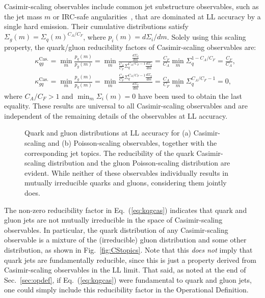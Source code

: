 \documentclass[letterpaper,11pt]{article}
\DeclareRobustCommand{\Sec}[1]{Sec.~\ref{#1}}
\DeclareRobustCommand{\Fig}[1]{Fig.~\ref{#1}}
\DeclareRobustCommand{\Eq}[1]{Eq.~(\ref{#1})}
\begin{document}
Casimir-scaling observables include common jet substructure observables, such as the jet mass $m$ or IRC-safe angularities~\cite{Berger:2003iw,Almeida:2008yp,Ellis:2010rwa,Larkoski:2014uqa,Larkoski:2014pca}, that are dominated at LL accuracy by a single hard emission.
%
Their cumulative distributions satisfy $\Sigma_g (m)= \Sigma_q(m)^{C_A/C_F}$, where $p_i(m) = d\Sigma_i/dm$.
%
Solely using this scaling property, the quark/gluon reducibility factors of Casimir-scaling observables are:
\begin{align}\label{eq:kqgcas}
&\kappa_{qg}^\text{Cas.} = \min_m\frac{p_q(m)}{p_g(m)} = \min_m\frac{\frac{d\Sigma_q}{dm}}{\frac{C_A}{C_F} \Sigma_q^{C_A/C_F - 1}\frac{d\Sigma_q}{dm}}  = \frac{C_F}{C_A} \min_m\Sigma_q^{1-C_A/C_F} = \frac{C_F}{C_A}, \\
&\kappa_{gq}^\text{Cas.} = \min_m\frac{p_g(m)}{p_q(m)} = \min_m\frac{\frac{C_A}{C_F} \Sigma_q^{C_A/C_F - 1}\frac{d\Sigma_q}{dm}}{\frac{d\Sigma_q}{dm}}  = \frac{C_A}{C_F} \min_m\Sigma_q^{C_A/C_F-1} = 0, \label{eq:kgqcas}
\end{align}
where $C_A/C_F > 1$ and $\min_m\Sigma_i(m)=0$ have been used to obtain the last equality.
%
These results are universal to all Casimir-scaling observables and are independent of the remaining details of the observables at LL accuracy.

\begin{figure}[t]
\centering
{}
\caption{
%
Quark and gluon distributions at LL accuracy for (a) Casimir-scaling and (b) Poisson-scaling observables, together with the corresponding jet topics.
%
The reducibility of the quark Casimir-scaling distribution and the gluon Poisson-scaling distribution are evident.
%
While neither of these observables individually results in mutually irreducible quarks and gluons, considering them jointly does.
}
\label{fig:LLtopics}
\end{figure}


The non-zero reducibility factor in \Eq{eq:kqgcas} indicates that quark and gluon jets are not mutually irreducible in the space of Casimir-scaling observables.
%
In particular, the quark distribution of any Casimir-scaling observable is a mixture of the (irreducible) gluon distribution and some other distribution, as shown in \Fig{fig:CStopics}.
%
Note that this {\it does not} imply that quark jets are fundamentally reducible, since this is just a property derived from Casimir-scaling observables in the LL limit.
%
That said, as noted at the end of \Sec{sec:opdef}, if \Eq{eq:kqgcas} were fundamental to quark and gluon jets, one could simply include this reducibility factor in the Operational Definition.
\end{document}

